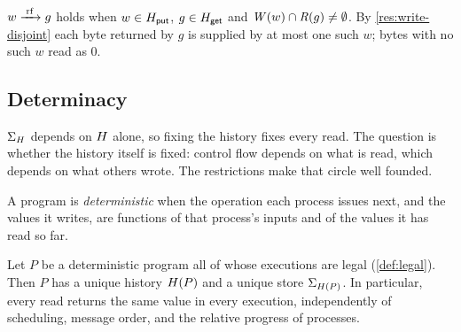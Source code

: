 \begin{definition}\label{def:reads-from}
$w \xrightarrow{\;\mathrm{rf}\;} g$ holds when $w \in H_{\mathsf{put}}$, $g \in H_{\mathsf{get}}$ and
$\mathit{W}(w) \cap \mathit{R}(g) \ne \emptyset$. By \cref{res:write-disjoint} each byte
returned by $g$ is supplied by at most one such $w$; bytes with no such $w$
read as $0$.
\end{definition}

\subsection{Determinacy}
\label{sec:l0-determinacy}

$\Sigma_{H}$ depends on $H$ alone, so fixing the \gls{history} fixes every
read. The question is whether the history itself is fixed: control flow
depends on what is read, which depends on what others wrote. The restrictions
make that circle well founded.

\begin{definition}\label{def:det-program}
A program is \emph{deterministic} when the operation each process issues next,
and the values it writes, are functions of that process's inputs and of the
values it has read so far.
\end{definition}

\begin{theorem}[Determinacy]\label{thm:determinism}
Let $P$ be a deterministic program all of whose executions are legal
(\cref{def:legal}). Then $P$ has a unique history $H(P)$ and a unique
store $\Sigma_{H(P)}$. In particular, every read returns the same value in
every execution, independently of scheduling, message order, and the relative
progress of processes.
\end{theorem}

